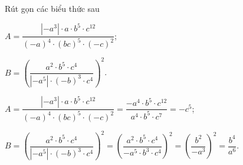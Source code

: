 \begin{vn}
Rút gọn các biểu thức sau
\begin{listEX}[2]
\item $A=\dfrac{\left|-a^3\right|\cdot a\cdot b^5\cdot c^{12}}{(-a)^4\cdot (bc)^5\cdot (-c)^2}$;
\item $B=\left(\dfrac{a^2\cdot b^5\cdot c^4}{\left|-a^5\right|\cdot (-b)^3\cdot c^4}\right)^2$.
\end{listEX}
\loigiai
{
\begin{listEX}
\item $A=\dfrac{\left|-a^3\right|\cdot a\cdot b^5\cdot c^{12}}{(-a)^4\cdot (bc)^5\cdot (-c)^2}=\dfrac{-a^4\cdot b^5\cdot c^{12}}{a^4\cdot b^5\cdot c^7}=-c^5$;
\item $B=\left(\dfrac{a^2\cdot b^5\cdot c^4}{\left|-a^5\right|\cdot (-b)^3\cdot c^4}\right)^2=\left(\dfrac{a^2\cdot b^5\cdot c^4}{-a^5\cdot b^3\cdot c^4}\right)^2=\left(\dfrac{b^2}{-a^3}\right)^2=\dfrac{b^4}{a^6}$.
\end{listEX}
}
\end{vn}

